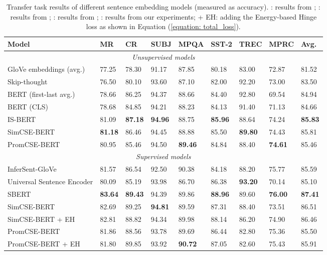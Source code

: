 \documentclass[11pt]{article}
\begin{document}
\begin{table*}[]
\small
\centering
\begin{tabular}{lllllllll}
\toprule
\textbf{Model}                      & \textbf{MR}    & \textbf{CR}    & \textbf{SUBJ}  & \textbf{MPQA}  & \textbf{SST-2}   & \textbf{TREC}  & \textbf{MPRC}  & \textbf{Avg.}  \\
\midrule
\midrule
\multicolumn{9}{c}{\textit{Unsupervised models}} \\\midrule
GloVe embeddings (avg.)    & 77.25 & 78.30  & 91.17 & 87.85 & 80.18 & 83.00    & 72.87 & 81.52 \\
Skip-thought               & 76.50  & 80.10  & 93.60  & 87.10  & 82.00    & 92.20  & 73.00    & 83.50  \\
BERT (first-last avg.) & 78.66 & 86.25 & 94.37 & 88.66 & 84.40  & 92.80  & 69.54 & 84.94 \\
BERT (CLS)             & 78.68 & 84.85 & 94.21 & 88.23 & 84.13 & 91.40  & 71.13 & 84.66 \\
IS-BERT                & 81.09 & \textbf{87.18} & \textbf{94.96} & 88.75 & \textbf{85.96} & 88.64 & 74.24 & \textbf{85.83} \\
SimCSE-BERT            & \textbf{81.18} & 86.46 & 94.45 & 88.88 & 85.50  & \textbf{89.80}  & 74.43 & 85.81 \\
 PromCSE-BERT           & 80.95 & 85.46 & 94.50  & \textbf{89.46} & 84.84 & 88.40  & \textbf{74.61} & 85.46 \\
\midrule
\midrule
\multicolumn{9}{c}{\textit{Supervised models}} \\\midrule
InferSent-GloVe            & 81.57 & 86.54 & 92.50  & 90.38 & 84.18 & 88.20  & 75.77 & 85.59 \\
Universal Sentence Encoder & 80.09 & 85.19 & 93.98 & 86.70  & 86.38 & \textbf{93.20}  & 70.14 & 85.10  \\
SBERT                  & \textbf{83.64} & \textbf{89.43} & 94.39 & 89.86 & \textbf{88.96} & 89.60  & \textbf{76.00}    & \textbf{87.41} \\
SimCSE-BERT            & 82.69 & 89.25 & \textbf{94.81} & 89.59 & 87.31 & 88.40  & 73.51 & 86.51 \\
 SimCSE-BERT + EH         &82.81       &88.82       &94.34       &89.98       &88.14       &86.20       &74.90       &86.46       \\
 PromCSE-BERT           &81.86       &88.56       &93.78       &89.69       &86.44       &82.80       &75.36       &85.50       \\
 PromCSE-BERT + EH        &81.80       &89.85       &93.92       &\textbf{90.72}       &87.05       &82.60       &75.43       &85.91 \\
\bottomrule
\end{tabular}
\caption{\label{tab: transfer tasks}
Transfer task results of different sentence embedding models (measured as accuracy). : results from \cite{ReimersG19sbert}; : results from \cite{zhang-etal-2020-isbert}; : results from \cite{gao2021simcse};  : results from our experiments; + EH: adding the Energy-based Hinge loss as shown in Equation (\ref{equation: total_loss}).
}
\end{table*}
\end{document}
